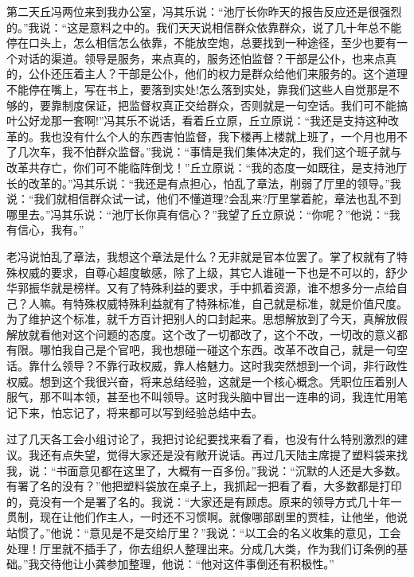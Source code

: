 \documentclass[12pt,oneside]{book}
\begin{document}
第二天丘冯两位来到我办公室，冯其乐说：``池厅长你昨天的报告反应还是很强烈的。''我说：``这是意料之中的。我们天天说相信群众依靠群众，说了几十年总不能停在口头上，怎么相信怎么依靠，不能放空炮，总要找到一种途径，至少也要有一个对话的渠道。领导是服务，来点真的，服务还怕监督？干部是公仆，也来点真的，公仆还压着主人？干部是公仆，他们的权力是群众给他们来服务的。这个道理不能停在嘴上，写在书上，要落到实处!怎么落到实处，靠我们这些人自觉那是不够的，要靠制度保证，把监督权真正交给群众，否则就是一句空话。我们可不能搞叶公好龙那一套啊!''冯其乐不说话，看着丘立原，丘立原说：``我还是支持这种改革的。我也没有什么个人的东西害怕监督，我下楼再上楼就上班了，一个月也用不了几次车，我不怕群众监督。''我说：``事情是我们集体决定的，我们这个班子就与改革共存亡，你们可不能临阵倒戈！''丘立原说：``我的态度一如既往，是支持池厅长的改革的。''冯其乐说：``我还是有点担心，怕乱了章法，削弱了厅里的领导。''我说：``我们就相信群众试一试，他们不懂道理?会乱来?厅里掌着舵，章法也乱不到哪里去。''冯其乐说：``池厅长你真有信心？''我望了丘立原说：``你呢？''他说：``我有信心，我有。''

老冯说怕乱了章法，我想这个章法是什么？无非就是官本位罢了。掌了权就有了特殊权威的要求，自尊心超度敏感，除了上级，其它人谁碰一下也是不可以的，舒少华郭振华就是榜样。又有了特殊利益的要求，手中抓着资源，谁不想多分一点给自己？人嘛。有特殊权威特殊利益就有了特殊标准，自己就是标准，就是价值尺度。为了维护这个标准，就千方百计把别人的口封起来。思想解放到了今天，真解放假解放就看他对这个问题的态度。这个改了一切都改了，这个不改，一切改的意义都有限。哪怕我自己是个官吧，我也想碰一碰这个东西。改革不改自己，就是一句空话。靠什么领导？不靠行政权威，靠人格魅力。这时我突然想到一个词，非行政性权威。想到这个我很兴奋，将来总结经验，这就是一个核心概念。凭职位压着别人服气，那不叫本领，甚至也不叫领导。这时我头脑中冒出一连串的词，我连忙用笔记下来，怕忘记了，将来都可以写到经验总结中去。

过了几天各工会小组讨论了，我把讨论纪要找来看了看，也没有什么特别激烈的建议。我还有点失望，觉得大家还是没有敞开说话。再过几天陆主席提了塑料袋来找我，说：``书面意见都在这里了，大概有一百多份。''我说：``沉默的人还是大多数。有署了名的没有？''他把塑料袋放在桌子上，我抓起一把看了看，大多数都是打印的，竟没有一个是署了名的。我说：``大家还是有顾虑。原来的领导方式几十年一贯制，现在让他们作主人，一时还不习惯啊。就像哪部剧里的贾桂，让他坐，他说站惯了。''他说：``意见是不是交给厅里？''我说：``以工会的名义收集的意见，工会处理！厅里就不插手了，你去组织人整理出来。分成几大类，作为我们订条例的基础。''我交待他让小龚参加整理，他说：``他对这件事倒还有积极性。''
\end{document}
